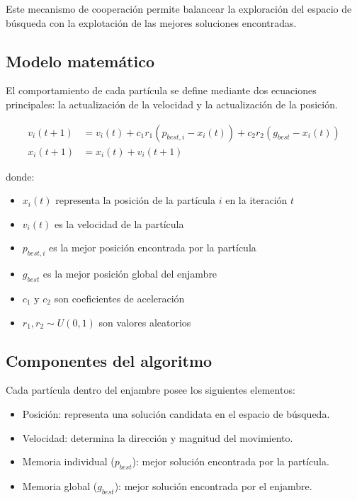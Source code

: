 Este mecanismo de cooperación permite balancear la exploración del
espacio de búsqueda con la explotación de las mejores soluciones encontradas.

\subsection{Modelo matemático}

El comportamiento de cada partícula se define mediante dos ecuaciones
principales: la actualización de la velocidad y la actualización de la posición.

\begin{align}
  v_i(t+1) &= v_i(t) + c_1 r_1 (p_{best,i} - x_i(t)) + c_2 r_2
  (g_{best} - x_i(t)) \\
  x_i(t+1) &= x_i(t) + v_i(t+1)
\end{align}

donde:
\begin{itemize}
  \item $x_i(t)$ representa la posición de la partícula $i$ en la iteración $t$
  \item $v_i(t)$ es la velocidad de la partícula
  \item $p_{best,i}$ es la mejor posición encontrada por la partícula
  \item $g_{best}$ es la mejor posición global del enjambre
  \item $c_1$ y $c_2$ son coeficientes de aceleración
  \item $r_1, r_2 \sim U(0,1)$ son valores aleatorios
\end{itemize}

\subsection{Componentes del algoritmo}

Cada partícula dentro del enjambre posee los siguientes elementos:

\begin{itemize}
  \item Posición: representa una solución candidata en el espacio de búsqueda.
  \item Velocidad: determina la dirección y magnitud del movimiento.
  \item Memoria individual ($p_{best}$): mejor solución encontrada
    por la partícula.
  \item Memoria global ($g_{best}$): mejor solución encontrada por el enjambre.
\end{itemize}

